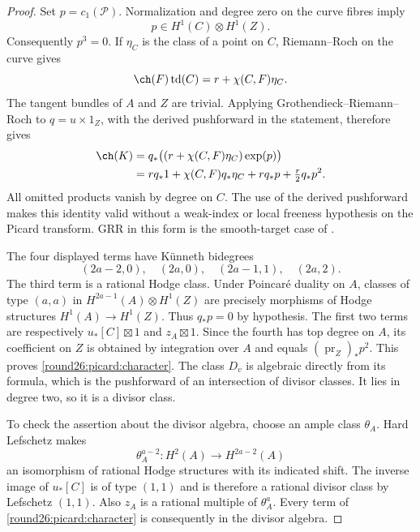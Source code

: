 \begin{proof}
Set $p=c_1(\mathcal P)$. Normalization and degree zero on the curve
fibres imply
\[
 p\in H^1(C)\otimes H^1(Z).
\]
Consequently $p^3=0$. If $\eta_C$ is the class of a point on $C$,
Riemann--Roch on the curve gives
\[
 \ch(F)\td(C)=r+\chi(C,F)\eta_C.
\]
The tangent bundles of $A$ and $Z$ are trivial. Applying
Grothendieck--Riemann--Roch to $q=u\times1_Z$, with the derived
pushforward in the statement, therefore gives
\begin{align*}
 \ch(K)
 &=q_*\bigl((r+\chi(C,F)\eta_C)\exp(p)\bigr)\\
 &=r q_*1+\chi(C,F)q_*\eta_C+r q_*p+\tfrac r2q_*p^2.
\end{align*}
All omitted products vanish by degree on $C$. The use of the derived
pushforward makes this identity valid without a weak-index or local
freeness hypothesis on the Picard transform. GRR in this form is the
smooth-target case of \cite[Chapter~18]{Ful98}.

The four displayed terms have K\"unneth bidegrees
\[
 (2a-2,0),\quad(2a,0),\quad(2a-1,1),\quad(2a,2).
\]
The third term is a rational Hodge class. Under Poincar\'e duality on
$A$, classes of type $(a,a)$ in
$H^{2a-1}(A)\otimes H^1(Z)$ are precisely morphisms of Hodge
structures $H^1(A)\to H^1(Z)$. Thus $q_*p=0$ by hypothesis.
The first two terms are respectively $u_*[C]\boxtimes1$ and
$z_A\boxtimes1$. Since the fourth has top degree on $A$, its
coefficient on $Z$ is obtained by integration over $A$ and equals
$(\operatorname{pr}_Z)_*p^2$. This proves \eqref{round26:picard:character}.
The class $D_v$ is algebraic directly from its formula, which is the
pushforward of an intersection of divisor classes. It lies in degree
two, so it is a divisor class.

To check the assertion about the divisor algebra, choose an ample
class $\theta_A$. Hard Lefschetz makes
\[
 \theta_A^{a-2}:H^2(A)\longrightarrow H^{2a-2}(A)
\]
an isomorphism of rational Hodge structures with its indicated shift.
The inverse image of $u_*[C]$ is of type $(1,1)$ and is therefore a
rational divisor class by Lefschetz $(1,1)$. Also $z_A$ is a rational
multiple of $\theta_A^a$. Every term of
\eqref{round26:picard:character} is consequently in the divisor algebra.


\end{proof}
